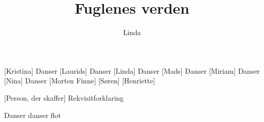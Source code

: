\documentclass[a4paper,11pt]{article}
\title{Fuglenes verden}
\author{Linda}
\begin{document}
\maketitle

\begin{roles}
    [Kristina] Danser
    [Laurids] Danser
    [Linda] Danser
    [Mads] Danser
    [Miriam] Danser
    [Nina] Danser
    [Morten Finne]
    [Søren]
    [Henriette]

\end{roles}

\begin{props}
    [Person, der skaffer] Rekvisitforklaring
\end{props}

\begin{song}
Danser danser flot
\end{song}
\end{document}
